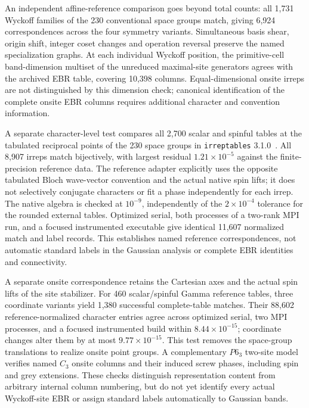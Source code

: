 An independent affine-reference comparison goes beyond total counts:
all 1,731 Wyckoff families of the 230 conventional space groups match,
giving 6,924 correspondences across the four symmetry variants.
Simultaneous basis shear, origin shift, integer coset changes and
operation reversal preserve the named specialization graphs.
At each individual Wyckoff position, the primitive-cell band-dimension
multiset of the unreduced maximal-site generators agrees with the
archived EBR table, covering 10,398 columns. Equal-dimensional onsite
irreps are not distinguished by this dimension check; canonical
identification of the complete onsite EBR columns requires additional
character and convention information.

A separate character-level test compares all 2,700 scalar and spinful
tables at the tabulated reciprocal points of the 230 space groups
in \texttt{irreptables} 3.1.0~\cite{Iraola2022IrRep,IrrepTables310}.
All 8,907 irreps match bijectively, with largest residual
$1.21\times10^{-5}$ against the finite-precision reference data.
The reference adapter explicitly uses the opposite tabulated Bloch
wave-vector convention and the actual native spin lifts; it does not
selectively conjugate characters or fit a phase independently for
each irrep. The native algebra is checked at $10^{-9}$, independently
of the $2\times10^{-4}$ tolerance for the rounded external tables.
Optimized serial, both processes of a two-rank MPI run, and a focused
instrumented executable give identical 11,607 normalized match and
label records. This establishes named reference correspondences,
not automatic standard labels in the Gaussian analysis or complete
EBR identities and connectivity.

A separate onsite correspondence retains the Cartesian axes and the
actual spin lifts of the site stabilizer. For 460 scalar/spinful
Gamma reference tables, three coordinate variants yield 1,380
successful complete-table matches. Their 88,602 reference-normalized
character entries agree across optimized serial, two MPI processes,
and a focused instrumented build within $8.44\times10^{-15}$;
coordinate changes alter them by at most $9.77\times10^{-15}$.
This test removes the space-group translations to realize onsite
point groups. A complementary $P6_3$ two-site model verifies named
$C_3$ onsite columns and their induced screw phases, including
spin and grey extensions. These checks distinguish representation
content from arbitrary internal column numbering, but do not yet
identify every actual Wyckoff-site EBR or assign standard labels
automatically to Gaussian bands.

